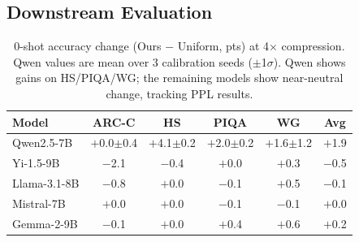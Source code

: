 \subsection{Downstream Evaluation}
\label{sec:downstream}

\begin{table}[t]
\centering
\small
\caption{0-shot accuracy change (Ours $-$ Uniform, pts) at 4$\times$ compression. Qwen values are mean over 3 calibration seeds ($\pm$1$\sigma$). Qwen shows gains on HS/PIQA/WG; the remaining models show near-neutral change, tracking PPL results.}
\label{tab:downstream}
\begin{tabular}{lccccc}
\toprule
Model & ARC-C & HS & PIQA & WG & Avg \\
\midrule
Qwen2.5-7B        & $+$0.0{\scriptsize$\pm$0.4} & $+$4.1{\scriptsize$\pm$0.2} & $+$2.0{\scriptsize$\pm$0.2} & $+$1.6{\scriptsize$\pm$1.2} & $+$1.9 \\
Yi-1.5-9B        & $-$2.1 & $-$0.4 & $+$0.0 & $+$0.3 & $-$0.5 \\
Llama-3.1-8B     & $-$0.8 & $+$0.0 & $-$0.1 & $+$0.5 & $-$0.1 \\
Mistral-7B       & $+$0.0 & $+$0.0 & $-$0.1 & $-$0.1 & $+$0.0 \\
Gemma-2-9B       & $-$0.1 & $+$0.0 & $+$0.4 & $+$0.6 & $+$0.2 \\
\bottomrule
\end{tabular}
\end{table}

